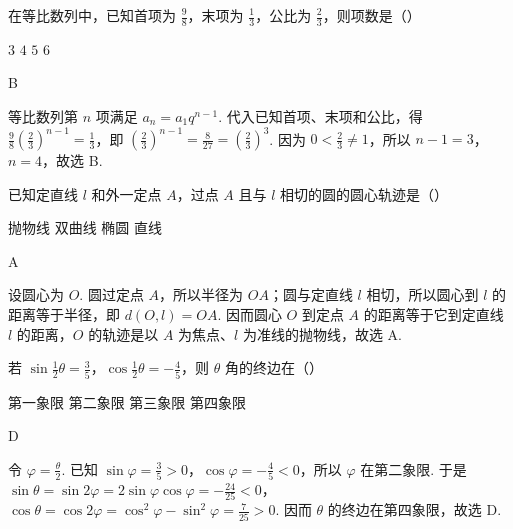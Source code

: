 \documentclass[UTF8,a4paper,oneside,11pt]{ctexbook}
\begin{document}
\begin{problem}

在等比数列中，已知首项为 \(\frac{9}{8}\)，末项为 \(\frac{1}{3}\)，公比为 \(\frac{2}{3}\)，则项数是（\quad）

\choices
    {\(3\)}
    {\(4\)}
    {\(5\)}
    {\(6\)}
\end{problem}

\begin{answer}
B
\end{answer}

\begin{solution}
等比数列第 \(n\) 项满足 \(a_n=a_1q^{n-1}\). 代入已知首项、末项和公比，得 \(\frac{9}{8}\left(\frac{2}{3}\right)^{n-1}=\frac13\)，即 \(\left(\frac23\right)^{n-1}=\frac{8}{27}=\left(\frac23\right)^3\). 因为 \(0<\frac23\neq1\)，所以 \(n-1=3\)，\(n=4\)，故选 B.
\end{solution}

\begin{problem}

已知定直线 \(l\) 和外一定点 \(A\)，过点 \(A\) 且与 \(l\) 相切的圆的圆心轨迹是（\quad）

\choices
    {抛物线}
    {双曲线}
    {椭圆}
    {直线}
\end{problem}

\begin{answer}
A
\end{answer}

\begin{solution}
设圆心为 \(O\). 圆过定点 \(A\)，所以半径为 \(OA\)；圆与定直线 \(l\) 相切，所以圆心到 \(l\) 的距离等于半径，即 \(d(O,l)=OA\). 因而圆心 \(O\) 到定点 \(A\) 的距离等于它到定直线 \(l\) 的距离，\(O\) 的轨迹是以 \(A\) 为焦点、\(l\) 为准线的抛物线，故选 A.
\end{solution}

\begin{problem}

若 \(\sin \frac{1}{2}\theta = \frac{3}{5}\)，\(\cos \frac{1}{2}\theta = -\frac{4}{5}\)，则 \(\theta\) 角的终边在（\quad）

\choices
    {第一象限}
    {第二象限}
    {第三象限}
    {第四象限}
\end{problem}

\begin{answer}
D
\end{answer}

\begin{solution}
令 \(\varphi=\frac{\theta}{2}\). 已知 \(\sin\varphi=\frac35>0\)，\(\cos\varphi=-\frac45<0\)，所以 \(\varphi\) 在第二象限. 于是 \(\sin\theta=\sin 2\varphi=2\sin\varphi\cos\varphi=-\frac{24}{25}<0\)，\(\cos\theta=\cos 2\varphi=\cos^{2}\varphi-\sin^{2}\varphi=\frac{7}{25}>0\). 因而 \(\theta\) 的终边在第四象限，故选 D.
\end{solution}
\end{document}
